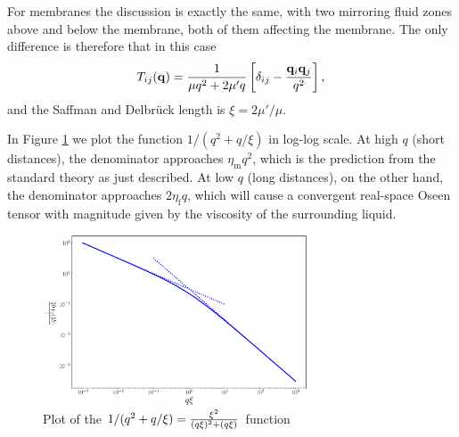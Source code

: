 For membranes the discussion is exactly the same, with two mirroring
fluid zones above and below the membrane, both of them affecting the
membrane. The only difference is therefore that in this case
\[
T_{ij}(\mathbf{q}) = \frac 1{\mu q^2 +  2 \mu' q  } \left[
  \delta_{ij} - \frac{ \mathbf{q}_i  \mathbf{q}_j}{q^2} 
\right],
\]
and the Saffman and Delbr{\"u}ck length is $\xi = 2 \mu'/\mu$.


In Figure \ref{fig:SD} we plot the function $1/(q^2+q/\xi)$ in log-log
scale.  At high $q$ (short distances), the denominator approaches
\( \eta_\mathrm{m} q^2 \), which is the prediction from the standard
theory as just described. At low $q$ (long distances), on the other
hand, the denominator approaches \( 2 \eta_\mathrm{f} q \), which will
cause a convergent real-space Oseen tensor with magnitude given by the
viscosity of the surrounding liquid.


\begin{figure}
      \includegraphics[width=0.7\textwidth]{figures/SD}
      \caption{Plot of the $1/(q^2+q/\xi) = { \xi^2 \over (q\xi)^2 + (q\xi) }$
      function
    \label{fig:SD}}
\end{figure}

